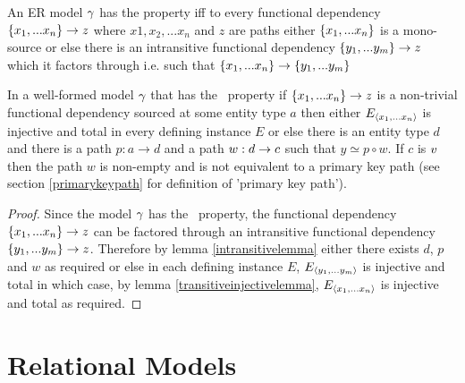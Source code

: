 \begin{definition}
\noindent An ER model $\gamma$ has the \term{\fdfactoring} property iff to every functional dependency $\left\{x_1,...x_n\right\} \rightarrow z$ where $x1, x_2, ... x_n$ and $z$ are \attributelike paths either $\left\{x_1,...x_n\right\}$ is
a mono-source or else there is an intransitive functional dependency $\left\{y_1,...y_m\right\} \rightarrow z$ which it factors through i.e. such that $\left\{x_1,...x_n\right\} \rightarrow \left\{y_1,...y_m\right\}$
\end{definition}
\begin{lemma}
\label{mainlemma}
In a well-formed model $\gamma$ that has the \fdfactoring\ property if $\{x_1,...x_n\} \rightarrow z$ is a non-trivial 
functional dependency sourced
at some entity type $a$ then either $E_{\langle x_1,...x_n\rangle}$ is injective and total in every defining instance $E$ 
or else there is an entity type $d$ and there is a path $p:a \rightarrow d$
and a  path $w:d \rightarrow c$  such that $y \simeq p \circ w$. If $c$ is $v$ then
the path $w$ is non-empty and is not equivalent to a primary key path (see section \ref{primarykeypath} for definition of 'primary key path').
\end{lemma}
\begin{proof}
Since the model $\gamma$  has the \fdfactoring\ property, the functional dependency $\left\{x_1,...x_n\right\} \rightarrow z$ can be factored through an intransitive functional
dependency $\left\{y_1,...y_m\right\} \rightarrow z$. Therefore by lemma \ref{intransitivelemma} either there exists $d$, $p$ and $w$ as required
or else in each defining instance $E$, $E_{\langle y_1,...y_m\rangle}$ is injective and total in which case, by lemma \ref{transitiveinjectivelemma}, $E_{\langle x_1,...x_n\rangle}$ is injective and total as required.
\end{proof}

\section{Relational Models}
	
